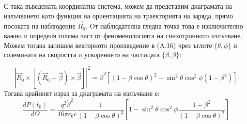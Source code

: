 \begin{appendices}
\begin{minipage}{15em}
			
		
		\captionsetup{font=footnotesize}
		\label{Emission_Frame}

\end{minipage}
\begin{minipage}{15em}
	С така въведената координатна система, можем да представим диаграмата на излъчването като функция на ориентацията на траекторията на заряда, прямо посоката на наблюдение $\vec{R}_0$. Oт наблюдателна гледна точка това е изключително важно и определя голяма част от феноменологията на синхотронното излъчване. Можем тогава запишем векторното произведение в (A.16) чрез ъглите $\{\theta,\phi\}$ и големината на скоростта и ускорението на частицата $\{\beta,\dot{\beta}\}$:
\end{minipage}

\begin{equation}
		\left|\vec{R}_0 \times \left[\left(\vec{R}_0 - \vec{\beta}\right)\times\dot{\vec{\beta}}\right]\right|^2 =\dot{\beta}^2\left[ 
		(1-\beta \cos\theta)^2 - \sin^2\theta\cos^2\phi (1-\beta^2)\right]
\end{equation}
Тогава крайният израз за диаграмата на излъчване е:
\begin{equation}\label{Radiation_pattern_analytic}
	\frac{dP(t_0)}{d\Omega} = \frac{q^2\dot{\beta}^2}{16\pi\epsilon_0 c}\frac{1}{(1-\beta\cos\theta)^3}\left[1-\sin^2\theta\cos^2\phi\frac{1 - \beta^2}{(1-\beta\cos\theta)^2}\right]
\end{equation}


\end{appendices}
